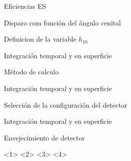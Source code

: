 \begin{frame}{Eficiencias ES}
\footnotesize
	\begin{block}{Disparo com funci\'on del \'angulo cenital}
		\begin{center}
		\hspace{1mm}
		\end{center}
	\end{block}
	\begin{block}{Definicion de la variable $h_{10}$}
		\begin{center}
		\end{center}
	\end{block}
\end{frame}

\begin{frame}{Integraci\'on temporal y en superficie}
	\begin{block}{M\'etodo de calculo}
		\begin{center}
		\end{center}
	\end{block}
\end{frame}

\begin{frame}{Integraci\'on temporal y en superficie}
	\begin{block}{Selecci\'on de la configuraci\'on del detector}
		\begin{center}
		\end{center}
	\end{block}
\end{frame}


\begin{frame}{Integraci\'on temporal y en superficie}
	\begin{block}{Envejecimiento de detector}
		\begin{center}
		<1>
		<2>
		<3>
		<4>
		\end{center}
	\end{block}
\end{frame}


